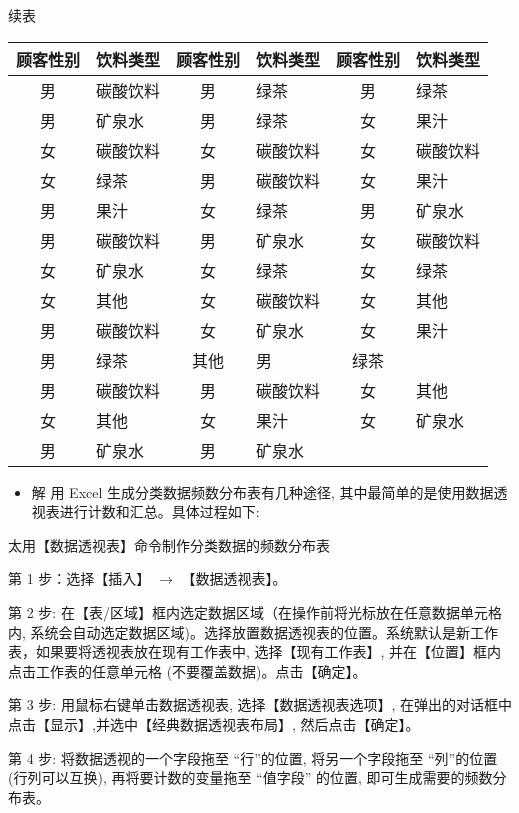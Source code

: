 \documentclass[10pt]{article}
\begin{document}
\begin{CJK*}{UTF8}{bsmi}
续表

\begin{center}
\begin{tabular}{cl||cl||cl}
\hline
顾客性别 & \multicolumn{1}{|c||}{饮料类型} & 顾客性别 & 饮料类型 & 顾客性别 & 饮料类型 \\
\hline
男 & 碳酸饮料 & 男 & 绿茶 & 男 & 绿茶 \\
男 & 矿泉水 & 男 & 绿茶 & 女 & 果汁 \\
女 & 碳酸饮料 & 女 & 碳酸饮料 & 女 & 碳酸饮料 \\
女 & 绿茶 & 男 & 碳酸饮料 & 女 & 果汁 \\
男 & 果汁 & 女 & 绿茶 & 男 & 矿泉水 \\
男 & 碳酸饮料 & 男 & 矿泉水 & 女 & 碳酸饮料 \\
女 & 矿泉水 & 女 & 绿茶 & 女 & 绿茶 \\
女 & 其他 & 女 & 碳酸饮料 & 女 & 其他 \\
男 & 碳酸饮料 & 女 & 矿泉水 & 女 & 果汁 \\
男 & 绿茶 & 其他 & 男 & 绿茶 &  \\
男 & 碳酸饮料 & 男 & 碳酸饮料 & 女 & 其他 \\
女 & 其他 & 女 & 果汁 & 女 & 矿泉水 \\
男 & 矿泉水 & 男 & 矿泉水 &  &  \\
\hline
\end{tabular}
\end{center}

\begin{itemize}
  \item 解 用 Excel 生成分类数据频数分布表有几种途径, 其中最简单的是使用数据透视表进行计数和汇总。具体过程如下:
\end{itemize}

太用【数据透视表】命令制作分类数据的频数分布表

第 1 步：选择【插入】 $\rightarrow$ 【数据透视表】。

第 2 步: 在【表/区域】框内选定数据区域（在操作前将光标放在任意数据单元格内, 系统会自动选定数据区域)。选择放置数据透视表的位置。系统默认是新工作表，如果要将透视表放在现有工作表中, 选择【现有工作表】, 并在【位置】框内点击工作表的任意单元格 (不要覆盖数据)。点击【确定】。

第 3 步: 用鼠标右键单击数据透视表, 选择【数据透视表选项】, 在弹出的对话框中点击【显示】,并选中【经典数据透视表布局】, 然后点击【确定】。

第 4 步: 将数据透视的一个字段拖至 “行”的位置, 将另一个字段拖至 “列”的位置 (行列可以互换), 再将要计数的变量拖至 “值字段” 的位置, 即可生成需要的频数分布表。


\end{CJK*}
\end{document}
